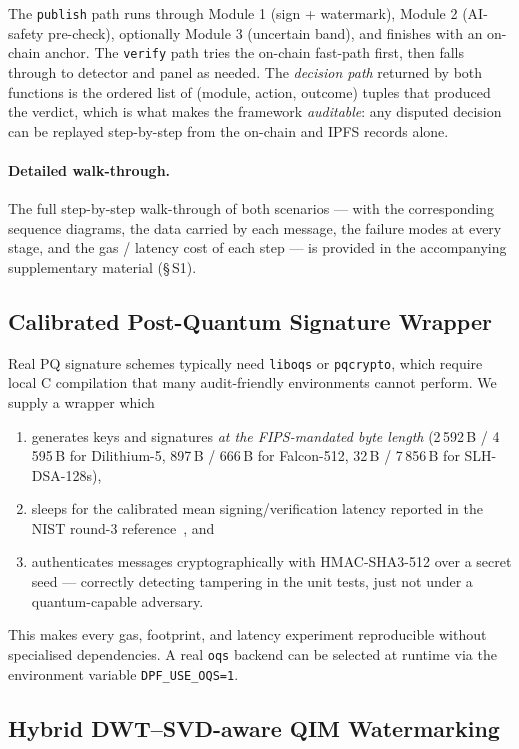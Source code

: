\documentclass[11pt,a4paper]{article}
\theoremstyle{definition}
\theoremstyle{plain}
\theoremstyle{remark}
\begin{document}
The \texttt{publish} path runs through Module 1 (sign + watermark),
Module 2 (AI-safety pre-check), optionally Module 3 (uncertain band),
and finishes with an on-chain anchor. The \texttt{verify} path tries
the on-chain fast-path first, then falls through to detector and
panel as needed. The \emph{decision path} returned by both functions
is the ordered list of (module, action, outcome) tuples that
produced the verdict, which is what makes the framework
\emph{auditable}: any disputed decision can be replayed step-by-step
from the on-chain and IPFS records alone.

\paragraph{Detailed walk-through.} The full step-by-step
walk-through of both scenarios --- with the corresponding sequence
diagrams, the data carried by each message, the failure modes at
every stage, and the gas / latency cost of each step --- is provided
in the accompanying supplementary material
(\S\,S1).

\subsection{Calibrated Post-Quantum Signature Wrapper}
\label{sec:pqwrap}

Real PQ signature schemes typically need \texttt{liboqs} or
\texttt{pqcrypto}, which require local C compilation that many
audit-friendly environments cannot perform. We supply a wrapper which
\begin{enumerate}[leftmargin=*,nosep]
\item generates keys and signatures \emph{at the FIPS-mandated byte
length} (2\,592\,B / 4\,595\,B for Dilithium-5, 897\,B / 666\,B for
Falcon-512, 32\,B / 7\,856\,B for SLH-DSA-128s),
\item sleeps for the calibrated mean signing/verification latency
reported in the NIST round-3 reference~\cite{bib17}, and
\item authenticates messages cryptographically with HMAC-SHA3-512 over
a secret seed --- correctly detecting tampering in the unit tests, just
not under a quantum-capable adversary.
\end{enumerate}
This makes every gas, footprint, and latency experiment reproducible
without specialised dependencies. A real \texttt{oqs} backend can be
selected at runtime via the environment variable \texttt{DPF\_USE\_OQS=1}.

\subsection{Hybrid DWT--SVD-aware QIM Watermarking}\label{sec:wm}
\end{document}
